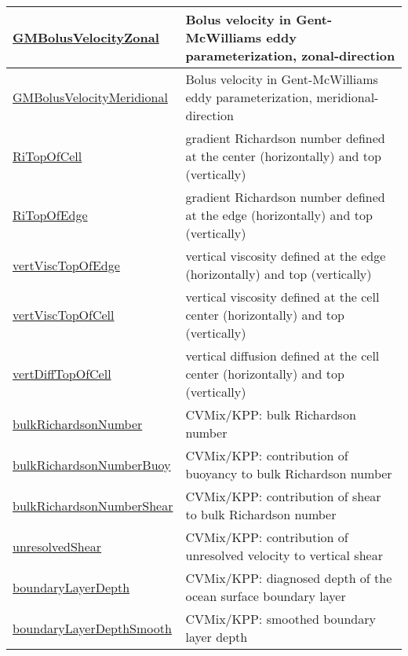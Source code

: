 {\begin{center}
\begin{longtable}{| p{2.0in} | p{4.0in} |}
    \hline
    \hyperref[subsec:var_sec_diagnostics_GMBolusVelocityZonal]{GMBolusVelocityZonal} & Bolus velocity in Gent-McWilliams eddy parameterization, zonal-direction \\
    \hline
    \hyperref[subsec:var_sec_diagnostics_GMBolusVelocityMeridional]{GMBolusVelocityMeridional} & Bolus velocity in Gent-McWilliams eddy parameterization, meridional-direction \\
    \hline
    \hyperref[subsec:var_sec_diagnostics_RiTopOfCell]{RiTopOfCell} & gradient Richardson number defined at the center (horizontally) and top (vertically) \\
    \hline
    \hyperref[subsec:var_sec_diagnostics_RiTopOfEdge]{RiTopOfEdge} & gradient Richardson number defined at the edge (horizontally) and top (vertically) \\
    \hline
    \hyperref[subsec:var_sec_diagnostics_vertViscTopOfEdge]{vertViscTopOfEdge} & vertical viscosity defined at the edge (horizontally) and top (vertically) \\
    \hline
    \hyperref[subsec:var_sec_diagnostics_vertViscTopOfCell]{vertViscTopOfCell} & vertical viscosity defined at the cell center (horizontally) and top (vertically) \\
    \hline
    \hyperref[subsec:var_sec_diagnostics_vertDiffTopOfCell]{vertDiffTopOfCell} & vertical diffusion defined at the cell center (horizontally) and top (vertically) \\
    \hline
    \hyperref[subsec:var_sec_diagnostics_bulkRichardsonNumber]{bulkRichardsonNumber} & CVMix/KPP: bulk Richardson number \\
    \hline
    \hyperref[subsec:var_sec_diagnostics_bulkRichardsonNumberBuoy]{bulkRichardsonNumberBuoy} & CVMix/KPP: contribution of buoyancy to bulk Richardson number \\
    \hline
    \hyperref[subsec:var_sec_diagnostics_bulkRichardsonNumberShear]{bulkRichardsonNumberShear} & CVMix/KPP: contribution of shear to bulk Richardson number \\
    \hline
    \hyperref[subsec:var_sec_diagnostics_unresolvedShear]{unresolvedShear} & CVMix/KPP: contribution of unresolved velocity to vertical shear \\
    \hline
    \hyperref[subsec:var_sec_diagnostics_boundaryLayerDepth]{boundaryLayerDepth} & CVMix/KPP: diagnosed depth of the ocean surface boundary layer \\
    \hline
    \hyperref[subsec:var_sec_diagnostics_boundaryLayerDepthSmooth]{boundaryLayerDepthSmooth} & CVMix/KPP: smoothed boundary layer depth \\

\end{longtable}
\end{center}}
